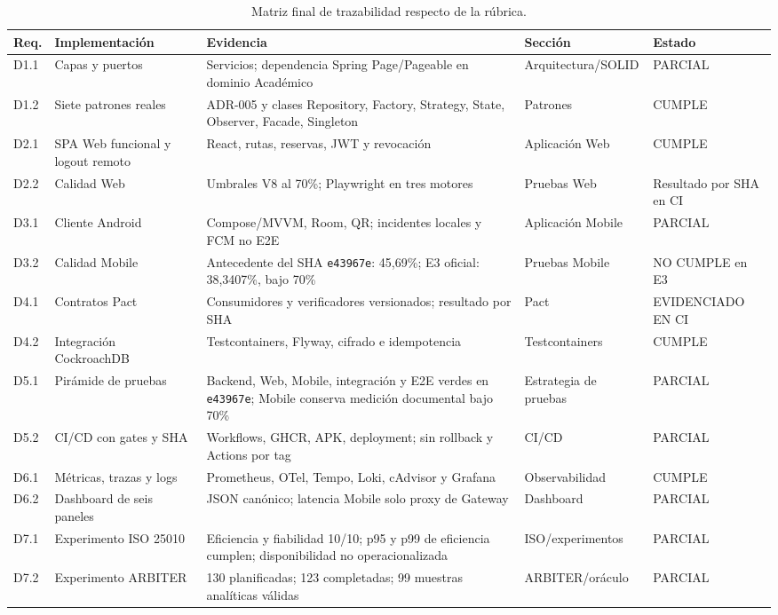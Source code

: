 \begin{table}[ht]
  \centering
  \scriptsize
  \caption{Matriz final de trazabilidad respecto de la rúbrica.}
  \label{tab:trazabilidad-final}
  \begin{tabular}{|p{1.1cm}|p{3.0cm}|p{4.1cm}|p{2.2cm}|p{1.7cm}|}
    \hline
    \textbf{Req.} & \textbf{Implementación} & \textbf{Evidencia} & \textbf{Sección} & \textbf{Estado} \\
    \hline
    D1.1 & Capas y puertos & Servicios; dependencia Spring Page/Pageable en dominio Académico & Arquitectura/SOLID & PARCIAL \\
    \hline
    D1.2 & Siete patrones reales & ADR-005 y clases Repository, Factory, Strategy, State, Observer, Facade, Singleton & Patrones & CUMPLE \\
    \hline
    D2.1 & SPA Web funcional y logout remoto & React, rutas, reservas, JWT y revocación & Aplicación Web & CUMPLE \\
    \hline
    D2.2 & Calidad Web & Umbrales V8 al 70\%; Playwright en tres motores & Pruebas Web & Resultado por SHA en CI \\
    \hline
    D3.1 & Cliente Android & Compose/MVVM, Room, QR; incidentes locales y FCM no E2E & Aplicación Mobile & PARCIAL \\
    \hline
    D3.2 & Calidad Mobile & Antecedente del SHA \texttt{e43967e}: 45,69\%; E3 oficial: 38,3407\%, bajo 70\% & Pruebas Mobile & NO CUMPLE en E3 \\
    \hline
    D4.1 & Contratos Pact & Consumidores y verificadores versionados; resultado por SHA & Pact & EVIDENCIADO EN CI \\
    \hline
    D4.2 & Integración CockroachDB & Testcontainers, Flyway, cifrado e idempotencia & Testcontainers & CUMPLE \\
    \hline
    D5.1 & Pirámide de pruebas & Backend, Web, Mobile, integración y E2E verdes en \texttt{e43967e}; Mobile conserva medición documental bajo 70\% & Estrategia de pruebas & PARCIAL \\
    \hline
    D5.2 & CI/CD con gates y SHA & Workflows, GHCR, APK, deployment; sin rollback y Actions por tag & CI/CD & PARCIAL \\
    \hline
    D6.1 & Métricas, trazas y logs & Prometheus, OTel, Tempo, Loki, cAdvisor y Grafana & Observabilidad & CUMPLE \\
    \hline
    D6.2 & Dashboard de seis paneles & JSON canónico; latencia Mobile solo proxy de Gateway & Dashboard & PARCIAL \\
    \hline
    D7.1 & Experimento ISO 25010 & Eficiencia y fiabilidad 10/10; p95 y p99 de eficiencia cumplen; disponibilidad no operacionalizada & ISO/experimentos & PARCIAL \\
    \hline
    D7.2 & Experimento ARBITER & 130 planificadas; 123 completadas; 99 muestras analíticas válidas & ARBITER/oráculo & PARCIAL \\
    \hline
  \end{tabular}
\end{table}

